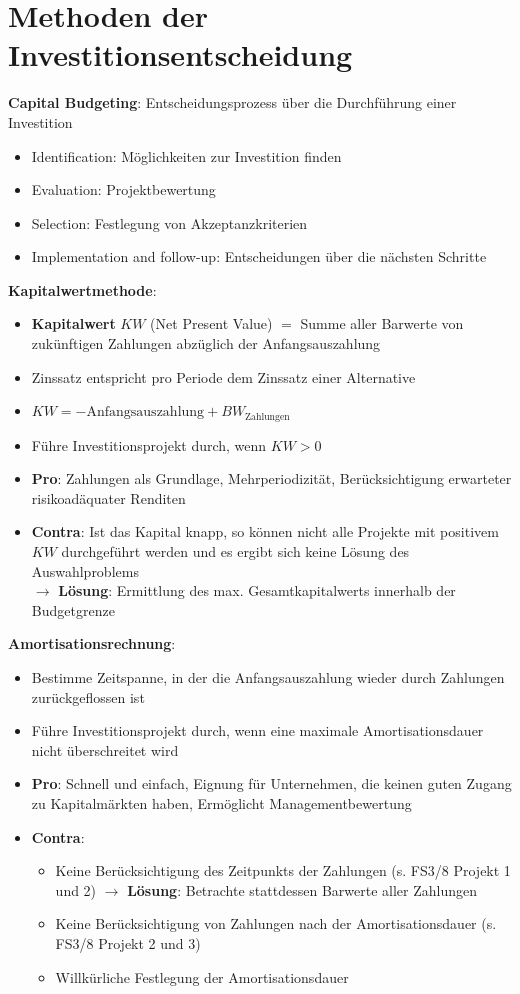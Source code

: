 \section{Methoden der Investitionsentscheidung}

\textbf{Capital Budgeting}: Entscheidungsprozess über die Durchführung einer Investition
\begin{itemize}
	\item Identification: Möglichkeiten zur Investition finden
	\item Evaluation: Projektbewertung
	\item Selection: Festlegung von Akzeptanzkriterien
	\item Implementation and follow-up: Entscheidungen über die nächsten Schritte
\end{itemize}
\bigskip
\textbf{Kapitalwertmethode}:
\begin{itemize}
	\item \textbf{Kapitalwert} $KW$ (Net Present Value) $=$ Summe aller Barwerte von zukünftigen Zahlungen abzüglich der Anfangsauszahlung
	\item Zinssatz entspricht pro Periode dem Zinssatz einer Alternative
	\item $KW = -\text{Anfangsauszahlung}+BW_\text{Zahlungen}$
	\item Führe Investitionsprojekt durch, wenn $KW > 0$
	\item \textbf{Pro}: Zahlungen als Grundlage, Mehrperiodizität, Berücksichtigung erwarteter risikoadäquater Renditen
	\item \textbf{Contra}: Ist das Kapital knapp, so können nicht alle Projekte mit positivem $KW$ durchgeführt werden und es ergibt sich keine Lösung des Auswahlproblems\\
	$\rightarrow$ \textbf{Lösung}: Ermittlung des max. Gesamtkapitalwerts innerhalb der Budgetgrenze
\end{itemize}
\bigskip
\textbf{Amortisationsrechnung}:
\begin{itemize}
	\item Bestimme Zeitspanne, in der die Anfangsauszahlung wieder durch Zahlungen zurückgeflossen ist
	\item Führe Investitionsprojekt durch, wenn eine maximale Amortisationsdauer nicht überschreitet wird
	\item \textbf{Pro}: Schnell und einfach, Eignung für Unternehmen, die keinen guten Zugang zu
	Kapitalmärkten haben, Ermöglicht Managementbewertung
	\item \textbf{Contra}: 
	\begin{itemize}
		\item Keine Berücksichtigung des Zeitpunkts der Zahlungen (s. FS3/8 Projekt 1 und 2) $\rightarrow$ \textbf{Lösung}: Betrachte stattdessen Barwerte aller Zahlungen
		\item Keine Berücksichtigung von Zahlungen nach der Amortisationsdauer (s. FS3/8 Projekt 2 und 3)
		\item Willkürliche Festlegung der Amortisationsdauer
	\end{itemize}
\end{itemize}
